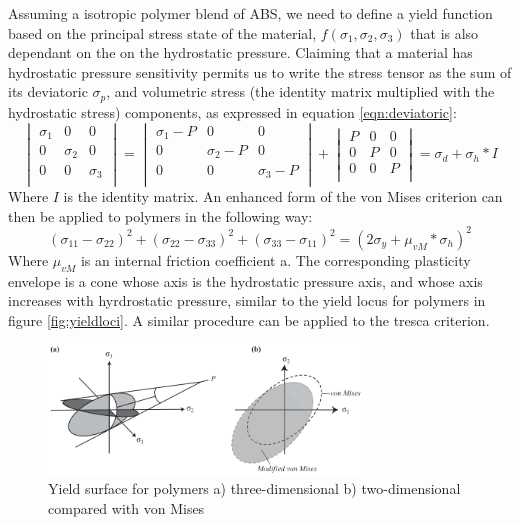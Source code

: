 Assuming a isotropic polymer blend of ABS, we need to define a yield function based on the principal stress state of the material, $f(\sigma_1,\sigma_2,\sigma_3)$ that is also dependant on the on the hydrostatic pressure. 
Claiming that a material has hydrostatic pressure sensitivity permits us to write the stress tensor as the sum of its deviatoric $\sigma_p$, and volumetric stress (the identity matrix multiplied with the hydrostatic stress) components, as expressed in equation \ref{eqn:deviatoric}:
\begin{equation}\label{eqn:deviatoric}
\begin{vmatrix}
\sigma_{1}&0&0\\
0&\sigma_{2}&0\\
0&0&\sigma_{3}\\
\end{vmatrix}
=
\begin{vmatrix}
\sigma_{1}-P&0&0\\
0&\sigma_{2}-P&0\\
0&0&\sigma_{3}-P\\
\end{vmatrix}
+
\begin{vmatrix}
P&0&0\\
0&P&0\\
0&0&P\\
\end{vmatrix}
= \sigma_d+\sigma_h*I
\end{equation}Where $I$ is the identity matrix.  
An enhanced form of the von Mises criterion can then be applied to polymers in the following way:
\begin{equation} \label{eqn:yieldpolymers}
  (\sigma_{11}-\sigma_{22})^2+(\sigma_{22}-\sigma_{33})^2+(\sigma_{33}-\sigma_{11})^2=(2\sigma_y+\mu_{vM}*\sigma_h)^2
\end{equation}
Where $\mu_{vM}$ is an internal friction coefficient a. The corresponding plasticity envelope is a cone whose axis is the hydrostatic pressure axis, and whose axis increases with hyrdrostatic pressure, similar to the yield locus for polymers in figure \ref{fig:yieldloci}. A similar procedure can be applied to the tresca criterion. 

\begin{figure}[H]
    \centering
    \includegraphics[width=0.75\textwidth]{chapter_2/figures/yieldpolymers.png}
    \caption{Yield surface for polymers a) three-dimensional b) two-dimensional compared with von Mises \cite{Halary2011PolymerMaterials} }
    \label{fig:Midplane}
\end{figure}

